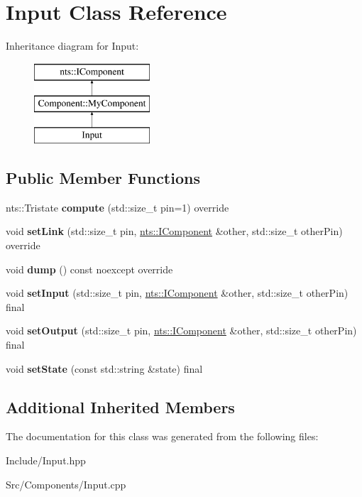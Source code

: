 \hypertarget{classInput}{}\section{Input Class Reference}
\label{classInput}
Inheritance diagram for Input\+:\begin{figure}[H]
\begin{center}
\leavevmode
\includegraphics[height=3.000000cm]{classInput}
\end{center}
\end{figure}
\subsection*{Public Member Functions}
\begin{DoxyCompactItemize}
\item 
\mbox{\label{classInput_a221cccaefc57a2f12e29e03878a15ab0}} 
nts\+::\+Tristate {\bfseries compute} (std\+::size\+\_\+t pin=1) override
\item 
\mbox{\label{classInput_af680922e1c312e604586b3786d4bafa7}} 
void {\bfseries set\+Link} (std\+::size\+\_\+t pin, \mbox{\hyperlink{classnts_1_1IComponent}{nts\+::\+I\+Component}} \&other, std\+::size\+\_\+t other\+Pin) override
\item 
\mbox{\label{classInput_a6177d3295b4f81134ba3a8d643eacaf9}} 
void {\bfseries dump} () const noexcept override
\item 
\mbox{\label{classInput_a657e1fb517b93986e86112d83ca6514c}} 
void {\bfseries set\+Input} (std\+::size\+\_\+t pin, \mbox{\hyperlink{classnts_1_1IComponent}{nts\+::\+I\+Component}} \&other, std\+::size\+\_\+t other\+Pin) final
\item 
\mbox{\label{classInput_a691d94760878e81c668c8e477aa17177}} 
void {\bfseries set\+Output} (std\+::size\+\_\+t pin, \mbox{\hyperlink{classnts_1_1IComponent}{nts\+::\+I\+Component}} \&other, std\+::size\+\_\+t other\+Pin) final
\item 
\mbox{\label{classInput_a208afe1233da126674ef84ca4060ee56}} 
void {\bfseries set\+State} (const std\+::string \&state) final
\end{DoxyCompactItemize}
\subsection*{Additional Inherited Members}


The documentation for this class was generated from the following files\+:\begin{DoxyCompactItemize}
\item 
Include/Input.\+hpp\item 
Src/\+Components/Input.\+cpp\end{DoxyCompactItemize}
